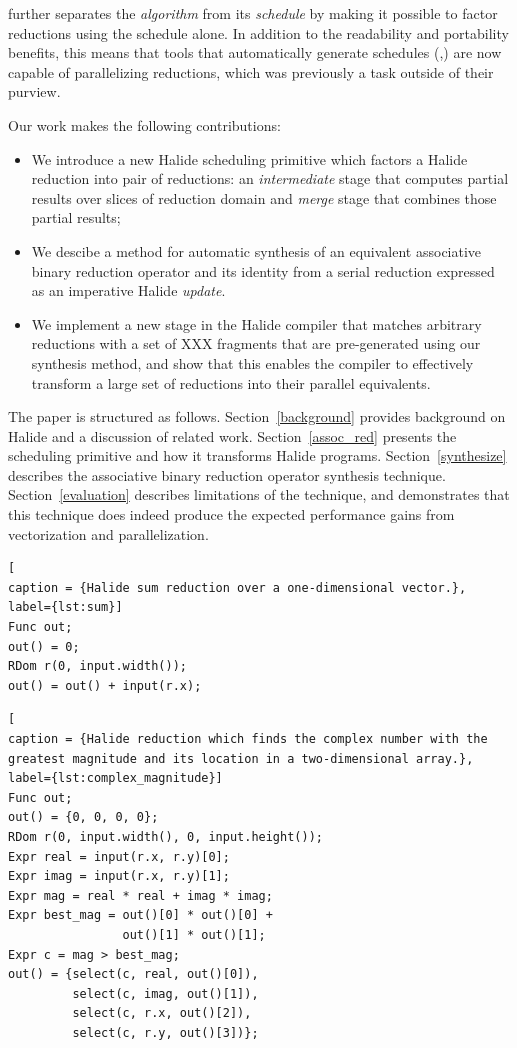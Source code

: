  further separates the \emph{algorithm} from its \emph{schedule} by making it possible to factor reductions using the schedule alone. In addition to the readability and portability benefits, this means that tools that automatically generate schedules (\cite{Mullapudi:2016:ASH:2897824.2925952},\cite{Ragan-Kelley:2013:HLC:2491956.2462176}) are now capable of parallelizing reductions, which was previously a task outside of their purview.

Our work makes the following contributions:
\begin{itemize}
  \item We introduce a new Halide scheduling primitive  which factors a Halide reduction into pair of reductions: an \emph{intermediate} stage that computes partial results over slices of reduction domain and \emph{merge} stage that combines those partial results;
  \item We descibe a method for automatic synthesis of an equivalent associative binary reduction operator and its identity from a serial reduction expressed as an imperative Halide \emph{update}.
  \item We implement a new stage in the Halide compiler that matches arbitrary reductions with a set of XXX fragments that are pre-generated using our synthesis method, and show that this enables the compiler to effectively transform a large set of reductions into their parallel equivalents.
\end{itemize}

The paper is structured as follows. Section~\ref{background} provides background on Halide and a discussion of related work. Section~\ref{assoc_red} presents the  scheduling primitive and how it transforms Halide programs. Section~\ref{synthesize} describes the associative binary reduction operator synthesis technique. Section~\ref{evaluation} describes limitations of the technique, and demonstrates that this technique does indeed produce the expected performance gains from vectorization and parallelization.

\begin{lstlisting}[
caption = {Halide sum reduction over a one-dimensional vector.}, label={lst:sum}]
Func out;
out() = 0;
RDom r(0, input.width());
out() = out() + input(r.x);
\end{lstlisting}

\begin{lstlisting}[
caption = {Halide reduction which finds the complex number with the greatest magnitude and its location in a two-dimensional array.}, label={lst:complex_magnitude}]
Func out;
out() = {0, 0, 0, 0};
RDom r(0, input.width(), 0, input.height());
Expr real = input(r.x, r.y)[0];
Expr imag = input(r.x, r.y)[1];
Expr mag = real * real + imag * imag;
Expr best_mag = out()[0] * out()[0] +
                out()[1] * out()[1];
Expr c = mag > best_mag;
out() = {select(c, real, out()[0]),
         select(c, imag, out()[1]),
         select(c, r.x, out()[2]),
         select(c, r.y, out()[3])};
\end{lstlisting}
